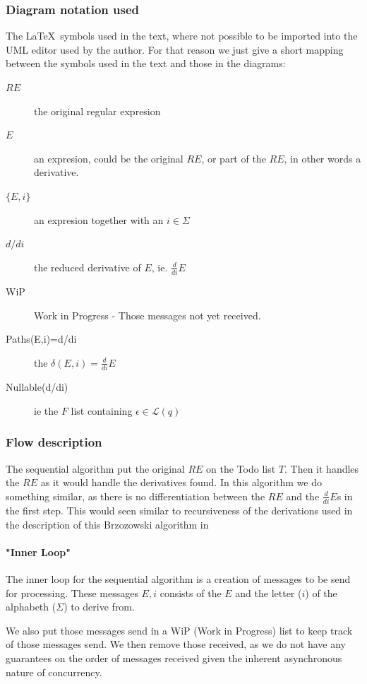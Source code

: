 \documentclass[a4paper,11pt]{report}
\begin{document}
\subsubsection{Diagram notation used}
The \LaTeX\  symbols used in the text, where not possible to be
imported into the UML editor used by the author. For that reason we
just give a short mapping between the symbols used in the text and
those in the diagrams:
\begin{description}
\item[$RE$] the original regular expresion
\item[$E$] an expresion, could be the original $RE$, or part of the $RE$, in other words a derivative.
\item[$\{E,i\}$] an expresion together with an $i\in\Sigma$
\item[$d/di$] the reduced derivative of $E$, ie. $\frac{d}{di}E$
\item[WiP] Work in Progress - Those messages not yet received.
\item[Paths(E,i)=d/di] the $\delta(E,i)= \frac{d}{di}E$
\item[Nullable(d/di)] ie the $F$ list containing $\epsilon\in\mathcal{L}(q)$
\end{description}

\subsubsection{Flow description}
\label{sec:flow-description}


The sequential algorithm put the original $RE$ on the Todo list
$T$. Then it handles the $RE$ as it would handle the derivatives
found. In this algorithm we do something similar, as there is no
differentiation between the $RE$ and the $\frac{d}{di}E$s in the first
step. This would seen similar to recursiveness of the derivations used
in the description of this Brzozowski algorithm in
\cite{brzozowski1964derivatives}

\paragraph{"Inner Loop"}
\label{sec:inner-loop}

The inner loop for the sequential algorithm is a creation of messages
to be send for processing. These messages ${E,i}$ consists of the $E$ and the
letter ($i$) of the alphabeth ($\Sigma$) to derive from.

We also put those messages send in a WiP (Work in Progress) list to
keep track of those messages send. We then remove those received, as
we do not have any guarantees on the order of messages received given
the inherent asynchronous nature of concurrency.
\end{document}
